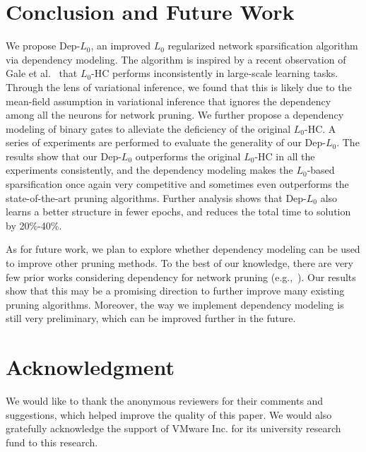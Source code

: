 \documentclass[runningheads, envcountsame, a4paper]{llncs}
\begin{document}
\section{Conclusion and Future Work}

We propose Dep-$L_0$, an improved $L_0$ regularized network sparsification algorithm via dependency modeling. The algorithm is inspired by a recent observation of Gale et al.~\cite{gale2019state} that $L_0$-HC performs inconsistently in large-scale learning tasks. Through the lens of variational inference, we found that this is likely due to the mean-field assumption in variational inference that ignores the dependency among all the neurons for network pruning. We further propose a dependency modeling of binary gates to alleviate the deficiency of the original $L_0$-HC. A series of experiments are performed to evaluate the generality of our Dep-$L_0$. The results show that our Dep-$L_0$ outperforms the original $L_0$-HC in all the experiments consistently, and the dependency modeling makes the $L_0$-based sparsification once again very competitive and sometimes even outperforms the state-of-the-art pruning algorithms. Further analysis shows that Dep-$L_0$ also learns a better structure in fewer epochs, and reduces the total time to solution by 20\%-40\%. 

As for future work, we plan to explore whether dependency modeling can be used to improve other pruning methods. To the best of our knowledge, there are very few prior works considering dependency for network pruning (e.g.,~\cite{park2020lookahead}). Our results show that this may be a promising direction to further improve many existing pruning algorithms. Moreover, the way we implement dependency modeling is still very preliminary, which can be improved further in the future. 

\vspace{-4pt}
\section*{Acknowledgment} 
We would like to thank the anonymous reviewers for their comments and suggestions, which helped improve the quality of this paper. We would also gratefully acknowledge the support of VMware Inc. for its university research fund to this research.
\end{document}
